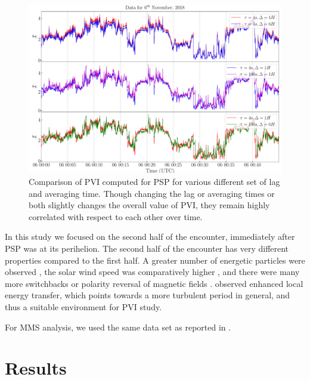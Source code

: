         \begin{figure}
            \includegraphics[width=1.\textwidth]{figures/chap6/pvi_comp_psp.pdf}
            \caption[$\mathcal{I}$ comparisons for different $\tau$]{Comparison of PVI computed for
            PSP for various different set of lag and averaging time. Though changing the lag or
            averaging times or both slightly changes the overall value of PVI, they remain highly
            correlated with respect to each other over time.}
            \label{fig:pvi_comp_psp}
        \end{figure}

        In this study we focused on the second half of the encounter, immediately after PSP was at
        its perihelion. The second half of the encounter has very different properties compared to
        the first half. A greater number of energetic particles were observed \citep{McComas2019},
        the solar wind speed was comparatively higher \citep{Kasper2019}, and there were many more
        switchbacks or polarity reversal of magnetic fields \citep{Bale2019}.
        \citet{Bandyopadhyay2020} observed enhanced local energy transfer, which points towards a
        more turbulent period in general, and thus a suitable environment for PVI study.

        For MMS analysis, we used the same data set as reported in .

    \section{Results} \label{sec:diss6}

